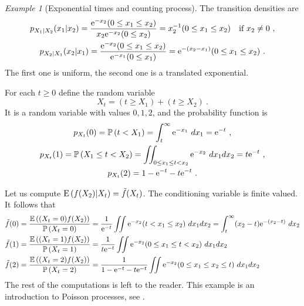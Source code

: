 \documentclass[12pt,a4paper]{amsart}
\theoremstyle{plain}%
\theoremstyle{definition}
\theoremstyle{remark}
\newtheorem{example}{Example}
\begin{document}
\begin{example}[Exponential times and counting process]
The transition densities are
\begin{gather*}
  p_{X_1|X_2}(x_1|x_2) = \frac{\mathrm{e}^{-x_2}(0 \leq x_1 \leq x_2)}{x_2
    \mathrm{e}^{-x_2}(0 \leq x_2)} = x_2^{-1} (0 \leq x_1 \leq x_2) \quad
  \text{if $x_2 \neq 0$} \ , \\ p_{X_2|X_1}(x_2|x_1) =
  \frac{\mathrm{e}^{-x_2}(0 \leq x_1 \leq x_2)}{\mathrm{e}^{-x_1}(0 \leq x_1)}
  = \mathrm{e}^{-(x_2-x_1)}(0 \leq x_1 \leq x_2) \ .
\end{gather*}
The first one is uniform, the second one is a translated exponential.

For each $t \geq 0$ define the random variable
\begin{equation*}
  X_t = (t \geq X_1) + (t \geq X_2) \ .
\end{equation*}
It is a random variable with values $0,1,2$, and the probability
function is
\begin{gather*}
  p_{X_t}(0) = \operatorname{\mathbb P}\left(t < X_1\right) = \int_t^\infty \mathrm{e}^{-x_1} \ dx_1 =
  \mathrm{e}^{-t} \ , \\
  p_{X_t}(1) = \operatorname{\mathbb P}\left(X_1 \leq t < X_2\right) = \iint_{0 \leq x_1 \leq t < x_2}
  \mathrm{e}^{-x_2}\ dx_1dx_2 = t\mathrm{e}^{-t} \ , \\
  p_{X_t}(2) = 1 - \mathrm{e}^{-t} - t\mathrm{e}^{-t} \ .
\end{gather*}

Let us compute $\operatorname{E}\left(f(X_2) \middle| X_t\right) = \tilde f (X_t)$. The
conditioning variable is finite valued. It follows that
\begin{align*}
  \tilde f(0) &= \frac{\operatorname{\mathbb E}\left((X_t=0)f(X_2)\right)}{\operatorname{\mathbb P}\left(X_t=0\right)} =
                \frac1{\mathrm{e}^{-t}} \iint \mathrm{e}^{-x_2}(t < x_1 \leq
                x_2)\ dx_1dx_2 = \int_t^\infty
                (x_2 - t) \mathrm{e}^{-(x_2-t)} \ dx_2 \\
  \tilde f(1) &= \frac{\operatorname{\mathbb E}\left((X_t=1)f(X_2)\right)}{\operatorname{\mathbb P}\left(X_t=1\right)} =
                \frac1{t\mathrm{e}^{-t}} \iint \mathrm{e}^{-x_2}(0 \leq x_1 \leq t < x_2)\ dx_1dx_2  \\
  \tilde f(2) &= \frac{\operatorname{\mathbb E}\left((X_t=2)f(X_2)\right)}{\operatorname{\mathbb P}\left(X_t=2\right)} =
                \frac1{1 - \mathrm{e}^{-t} - t\mathrm{e}^{-t}} \iint
                \mathrm{e}^{-x_2}(0 \leq x_1 \leq x_2 \leq t )\ dx_1dx_2 
\end{align*}
The rest of the computations is left to the reader. This example is an
introduction to Poisson processes, see
\cite[Ch.~5]{ross:2010introduction10}.
\end{example}
\end{document}
